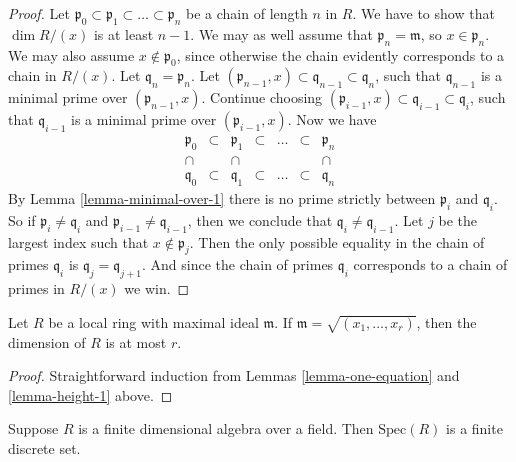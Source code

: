 \begin{proof}
Let $\mathfrak p_0 \subset \mathfrak p_1 \subset \ldots \subset \mathfrak p_n$
be a chain of length $n$ in $R$. We have to show that $\dim R/(x)$ is
at least $n-1$. We may as well assume that $\mathfrak p_n
= \mathfrak m$, so $x\in \mathfrak p_n$. We may also assume $x \not\in 
\mathfrak p_0$, since otherwise the chain evidently corresponds to
a chain in $R/(x)$. Let $\mathfrak q_n = \mathfrak p_n$.
Let $(\mathfrak p_{n-1}, x) \subset \mathfrak q_{n-1} \subset \mathfrak q_n$,
such that $\mathfrak q_{n-1}$ is a minimal prime over $(\mathfrak p_{n-1}, x)$.
Continue choosing $(\mathfrak p_{i-1}, x) \subset \mathfrak q_{i-1}
\subset \mathfrak q_i$, such that $\mathfrak q_{i-1}$ is a minimal prime
over $(\mathfrak p_{i-1}, x)$. Now we have
$$
\begin{matrix}
\mathfrak p_0
&
\subset 
&
\mathfrak p_1
&
\subset
&
\ldots
&
\subset
&
\mathfrak p_n
\\
\cap
&
&
\cap
&
&
&
&
\cap
\\
\mathfrak q_0
&
\subset 
&
\mathfrak q_1
&
\subset
&
\ldots
&
\subset
&
\mathfrak q_n
\end{matrix}
$$
By Lemma \ref{lemma-minimal-over-1} there is no prime strictly between
$\mathfrak p_i $ and $\mathfrak q_i$. So if $\mathfrak p_i \not= \mathfrak q_i$
and $\mathfrak p_{i-1} \not= \mathfrak q_{i-1}$, then we conclude
that $\mathfrak q_{i} \not= \mathfrak q_{i-1}$. Let $j$ be the largest
index such that $x \not \in \mathfrak p_j$. Then the only possible
equality in the chain of primes $\mathfrak q_i$ is $\mathfrak q_j =
\mathfrak q_{j+1}$. And since the chain of primes $\mathfrak q_i$
corresponds to a chain of primes in $R/(x)$ we win.
\end{proof}

\begin{lemma}
\label{lemma-nr-gens}
Let $R$ be a local ring with maximal ideal $\mathfrak m$.
If $\mathfrak m = \sqrt{(x_1,\ldots,x_r)}$, then
the dimension of $R$ is at most $r$.
\end{lemma}

\begin{proof}
Straightforward induction from Lemmas \ref{lemma-one-equation}
and \ref{lemma-height-1} above.
\end{proof}

\begin{lemma}
\label{lemma-finite-dimensional-algebra}
Suppose $R$ is a finite dimensional algebra over a field.
Then $\text{Spec}(R)$ is a finite discrete set.
\end{lemma}

